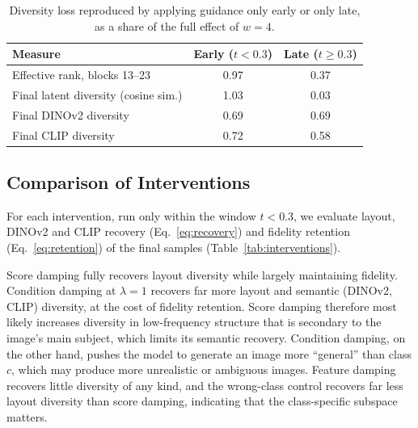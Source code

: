 \documentclass[sigconf,nonacm]{acmart}
\begin{document}
\begin{table}[t]
  \caption{Diversity loss reproduced by applying guidance only early or only late, as a share of the full effect of $w = 4$.}
  \label{tab:early-late}
  \small
  \begin{tabular}{@{}lcc@{}}
    \toprule
    Measure & Early ($t < 0.3$) & Late ($t \ge 0.3$) \\
    \midrule
    Effective rank, blocks 13--23 & 0.97 & 0.37 \\
    Final latent diversity (cosine sim.) & 1.03 & 0.03 \\
    Final DINOv2 diversity & 0.69 & 0.69 \\
    Final CLIP diversity & 0.72 & 0.58 \\
    \bottomrule
  \end{tabular}
\end{table}

\subsection{Comparison of Interventions}
\label{sec:res-interventions}

For each intervention, run only within the window $t < 0.3$, we evaluate layout, DINOv2 and CLIP recovery (Eq.~\eqref{eq:recovery}) and fidelity retention (Eq.~\eqref{eq:retention}) of the final samples (Table~\ref{tab:interventions}).

Score damping fully recovers layout diversity while largely maintaining fidelity. Condition damping at $\lambda = 1$ recovers far more layout and semantic (DINOv2, CLIP) diversity, at the cost of fidelity retention. Score damping therefore most likely increases diversity in low-frequency structure that is secondary to the image's main subject, which limits its semantic recovery. Condition damping, on the other hand, pushes the model to generate an image more ``general'' than class $c$, which may produce more unrealistic or ambiguous images. Feature damping recovers little diversity of any kind, and the wrong-class control recovers far less layout diversity than score damping, indicating that the class-specific subspace matters.
\end{document}

